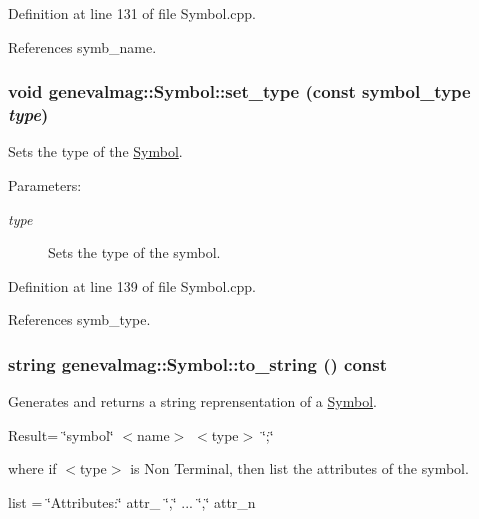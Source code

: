 Definition at line 131 of file Symbol.cpp.

References symb\_\-name.\hypertarget{classgenevalmag_1_1Symbol_3c15ef8b10ef26b663a6eca6c2b81d7f}{
\subsubsection[{set\_\-type}]{\setlength{\rightskip}{0pt plus 5cm}void genevalmag::Symbol::set\_\-type (const {\bf symbol\_\-type} {\em type})}}
\label{classgenevalmag_1_1Symbol_3c15ef8b10ef26b663a6eca6c2b81d7f}


Sets the type of the \hyperlink{classgenevalmag_1_1Symbol}{Symbol}. \begin{Desc}
\item[Parameters:]
\begin{description}
\item[{\em type}]Sets the type of the symbol. \end{description}
\end{Desc}


Definition at line 139 of file Symbol.cpp.

References symb\_\-type.\hypertarget{classgenevalmag_1_1Symbol_5f1d632b5fc5e04c731f3478fe90df18}{
\subsubsection[{to\_\-string}]{\setlength{\rightskip}{0pt plus 5cm}string genevalmag::Symbol::to\_\-string () const}}
\label{classgenevalmag_1_1Symbol_5f1d632b5fc5e04c731f3478fe90df18}


Generates and returns a string reprensentation of a \hyperlink{classgenevalmag_1_1Symbol}{Symbol}.\par
 \par
 Result= \char`\"{}symbol\char`\"{} $<$name$>$ $<$type$>$ \char`\"{};\char`\"{}\par
 \par
 where if $<$type$>$ is Non Terminal, then list the attributes of the symbol.\par
 \par
 list = \char`\"{}Attributes:\char`\"{} attr\_ \char`\"{},\char`\"{} ... \char`\"{},\char`\"{} attr\_\-n\par


